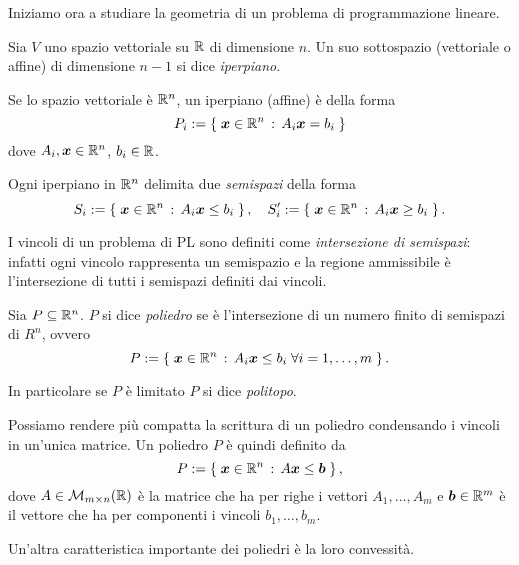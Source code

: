 Iniziamo ora a studiare la geometria di un problema di programmazione lineare.

\begin{definition}
    Sia $V$ uno spazio vettoriale su $\mathbb{R}$ di dimensione $n$. Un suo sottospazio (vettoriale o affine) di dimensione $n-1$ si dice \emph{iperpiano}.

    Se lo spazio vettoriale è $\mathbb{R}^n$, un iperpiano (affine) è della forma \begin{equation}
        \label{eq:iperpiano} P_i := \left\{\;\bm{x} \in \mathbb{R}^n \,:\, A_i\bm{x} = b_i\;\right\}
    \end{equation} dove $A_i, \bm{x} \in \mathbb{R}^n$, $b_i \in \mathbb{R}$.

    Ogni iperpiano in $\mathbb{R}^n$ delimita due \emph{semispazi} della forma \begin{equation}
        \label{eq:semispazi} S_i := \left\{\;\bm{x} \in \mathbb{R}^n \,:\, A_i\bm{x} \leq b_i\;\right\}, \quad S_i^\prime := \left\{\;\bm{x} \in \mathbb{R}^n \,:\, A_i\bm{x} \geq b_i\;\right\}.
    \end{equation}
\end{definition}

I vincoli di un problema di PL sono definiti come \emph{intersezione di semispazi}: infatti ogni vincolo rappresenta un semispazio e la regione ammissibile è l'intersezione di tutti i semispazi definiti dai vincoli.

\begin{definition}
    Sia $P \subseteq \mathbb{R}^n$. $P$ si dice \emph{poliedro} se è l'intersezione di un numero finito di semispazi di $R^n$, ovvero \begin{equation}
        P := \left\{\;\bm{x} \in \mathbb{R}^n \,:\, A_i\bm{x} \leq b_i \;\forall i = 1, \dots, m\;\right\}.
    \end{equation}

    In particolare se $P$ è limitato $P$ si dice \emph{politopo}.
\end{definition}

Possiamo rendere più compatta la scrittura di un poliedro condensando i vincoli in un'unica matrice. Un poliedro $P$ è quindi definito da \[
    P := \left\{\;\bm{x} \in \mathbb{R}^n \,:\, A\bm{x} \leq \bm{b}\;\right\}, 
\] dove $A \in \mathcal{M}_{m \times n}(\mathbb{R})$ è la matrice che ha per righe i vettori $A_1, \dots, A_m$ e $\bm{b} \in \mathbb{R}^m$ è il vettore che ha per componenti i vincoli $b_1, \dots, b_m$.

Un'altra caratteristica importante dei poliedri è la loro convessità.


